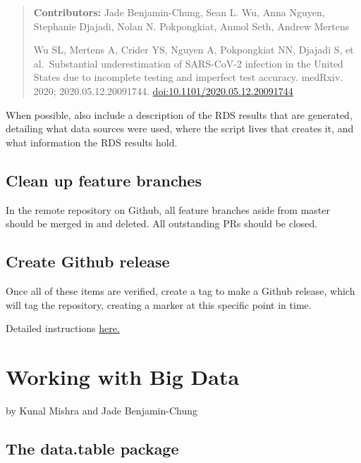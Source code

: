 \documentclass[
]{book}
\begin{document}
\begin{quote}
\textbf{Contributors:} Jade Benjamin-Chung, Sean L. Wu, Anna Nguyen, Stephanie Djajadi, Nolan N. Pokpongkiat, Anmol Seth, Andrew Mertens

Wu SL, Mertens A, Crider YS, Nguyen A, Pokpongkiat NN, Djajadi S, et al.~Substantial underestimation of SARS-CoV-2 infection in the United States due to incomplete testing and imperfect test accuracy. medRxiv. 2020; 2020.05.12.20091744. \url{doi:10.1101/2020.05.12.20091744}
\end{quote}

When possible, also include a description of the RDS results that are generated, detailing what data sources were used, where the script lives that creates it, and what information the RDS results hold.

\hypertarget{clean-up-feature-branches}{%
\section{Clean up feature branches}\label{clean-up-feature-branches}}

In the remote repository on Github, all feature branches aside from master should be merged in and deleted. All outstanding PRs should be closed.

\hypertarget{create-github-release}{%
\section{Create Github release}\label{create-github-release}}

Once all of these items are verified, create a tag to make a Github release, which will tag the repository, creating a marker at this specific point in time.

Detailed instructions \href{https://docs.github.com/en/enterprise/2.13/user/articles/creating-releases}{here.}

\hypertarget{working-with-big-data}{%
\chapter{Working with Big Data}\label{working-with-big-data}}

by Kunal Mishra and Jade Benjamin-Chung

\hypertarget{the-data.table-package}{%
\section{The data.table package}\label{the-data.table-package}}
\end{document}
